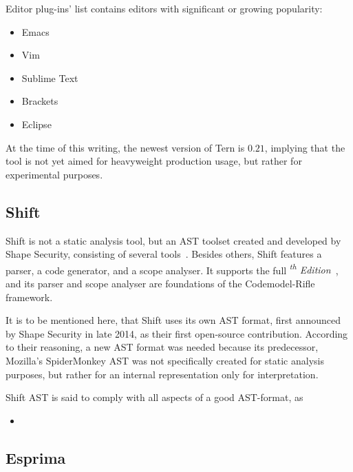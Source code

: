 Editor plug-ins' list contains editors with significant or growing popularity:

\begin{itemize}
\item Emacs
\item Vim
\item Sublime Text
\item Brackets
\item Eclipse
\end{itemize}

At the time of this writing, the newest version of Tern is $0.21$, implying that the tool is not yet aimed for heavyweight production usage, but rather for experimental purposes.


\subsection{Shift}

Shift is not a static analysis tool, but an AST toolset created and developed by Shape Security, consisting of several tools~\cite{shift-ast}. Besides others, Shift features a parser, a code generator, and a scope analyser. It supports the full \emph{\textsuperscript{th} Edition}~\cite{shift-ast}, and its parser and scope analyser are foundations of the Codemodel-Rifle framework.

It is to be mentioned here, that Shift uses its own AST format, first announced by Shape Security in late 2014, as their first open-source contribution. According to their reasoning, a new \es AST format was needed because its predecessor, Mozilla's SpiderMonkey AST was not specifically created for static analysis purposes, but rather for an internal representation only for interpretation.

Shift AST is said to comply with all aspects of a good AST-format, as

\begin{itemize}
\item {}~\cite{shift-ast-comparison}
\end{itemize}

\subsection{Esprima}

